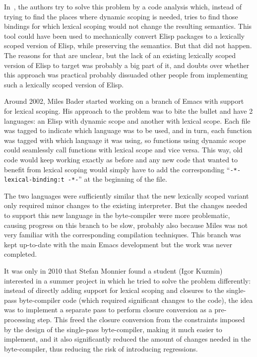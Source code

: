 \documentclass[format=acmsmall, review=false, screen=true]{acmart}
\newcommand \Elisp {Elisp}
\begin{document}
In~\cite{Neubauer01}, the authors try to solve this problem by a code
analysis which, instead of trying to find the places where dynamic scoping is
needed, tries to find those bindings for which lexical scoping would not
change the resulting semantics.  This tool could have been used to
mechanically convert \Elisp{} packages to a lexically scoped version of
\Elisp{}, while preserving the semantics.  But that did not happen.
The reasons for that are unclear, but the lack of an existing lexically
scoped version of \Elisp{} to target was probably a big part of it, and
doubts over whether this approach was practical probably dissuaded other
people from implementing such a lexically scoped version of \Elisp{}.

Around 2002, Miles Bader started working on a branch of Emacs with support
for lexical scoping.  His approach to the problem was to bite the bullet and
have 2 languages: an \Elisp{} with dynamic scope and another with lexical
scope.  Each file was tagged to indicate which language was to be used, and
in turn, each function was tagged with which language it was using, so
functions using dynamic scope could seamlessly call functions with lexical
scope and vice versa.  This way, old code would keep working exactly as
before and any new code that wanted to benefit from lexical scoping would
simply have to add the corresponding ``\texttt{-*- lexical-binding:t -*-}''
at the beginning of the file.

The two languages were sufficiently similar that the new lexically scoped
variant only required minor changes to the existing interpreter.  But the
changes needed to support this new language in the byte-compiler were more
problematic, causing progress on this branch to be slow, probably also
because Miles was not very familiar with the corresponding
compilation techniques.  This branch was kept up-to-date with the main Emacs
development but the work was never completed.

It was only in 2010 that Stefan Monnier found a student (Igor Kuzmin)
interested in a summer project in which he tried to solve the problem
differently: instead of directly adding support for lexical scoping and
closures to the single-pass byte-compiler code (which required significant
changes to the code), the idea was to implement a separate pass to perform
closure conversion as a pre-processing step.  This freed the closure
conversion from the constraints imposed by the design of the single-pass
byte-compiler, making it much easier to implement, and it also significantly
reduced the amount of changes needed in the byte-compiler, thus reducing the
risk of introducing regressions.
\end{document}
